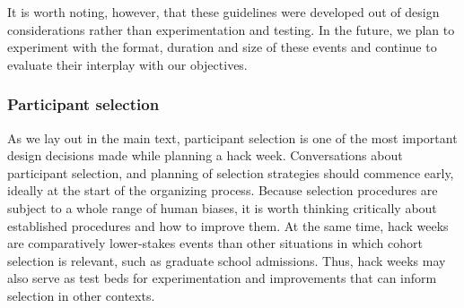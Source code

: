 \documentclass{aastex62}
\begin{document}
It is worth noting, however, that these guidelines were developed out of design considerations rather than experimentation and testing. In the future, we plan to experiment with the format, duration and size of these events and continue to evaluate their interplay with our objectives.

\subsubsection{Participant selection}

As we lay out in the main text, participant selection is one of the most important design decisions made while planning a hack week. Conversations about participant selection, and planning of selection strategies should commence early, ideally at the start of the organizing process.
Because selection procedures are subject to a whole range of human biases, it is worth thinking critically about established procedures and how to improve them. At the same time, hack weeks are comparatively lower-stakes events than other situations in which cohort selection is relevant, such as graduate school admissions. Thus, hack weeks may also serve as test beds for experimentation and improvements that can inform selection in other contexts.
\end{document}
